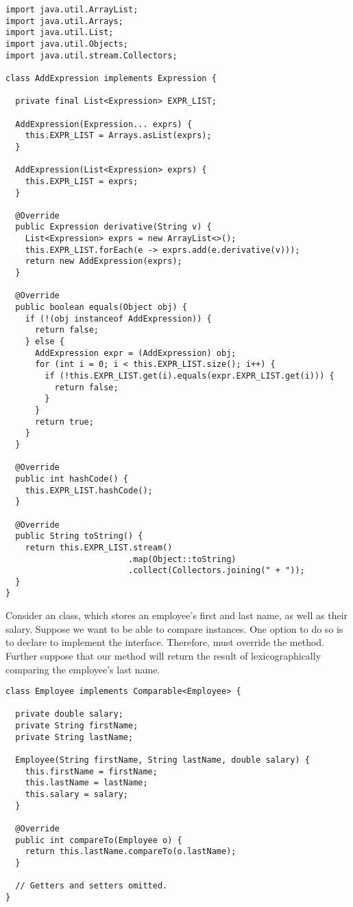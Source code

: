 \newpage %
\begin{lstlisting}[language=MyJava]
import java.util.ArrayList;
import java.util.Arrays;
import java.util.List;
import java.util.Objects;
import java.util.stream.Collectors;

class AddExpression implements Expression {

  private final List<Expression> EXPR_LIST;

  AddExpression(Expression... exprs) {
    this.EXPR_LIST = Arrays.asList(exprs);
  }

  AddExpression(List<Expression> exprs) { 
    this.EXPR_LIST = exprs; 
  }

  @Override
  public Expression derivative(String v) {
    List<Expression> exprs = new ArrayList<>();
    this.EXPR_LIST.forEach(e -> exprs.add(e.derivative(v)));
    return new AddExpression(exprs);
  }

  @Override
  public boolean equals(Object obj) {
    if (!(obj instanceof AddExpression)) { 
      return false; 
    } else { 
      AddExpression expr = (AddExpression) obj;
      for (int i = 0; i < this.EXPR_LIST.size(); i++) {
        if (!this.EXPR_LIST.get(i).equals(expr.EXPR_LIST.get(i))) { 
          return false; 
        }
      }
      return true;
    }
  }

  @Override
  public int hashCode() { 
    this.EXPR_LIST.hashCode(); 
  }

  @Override
  public String toString() { 
    return this.EXPR_LIST.stream()
                         .map(Object::toString)
                         .collect(Collectors.joining(" + "));
  }
}
\end{lstlisting}

\newpage %
Consider an  class, which stores an employee's first and last name, as well as their salary. 
Suppose we want to be able to compare  instances. 
One option to do so is to declare  to implement the  interface. 
Therefore,  must override the  method. 
Further suppose that our method will return the result of lexicographically comparing the employee's last name.

\begin{lstlisting}[language=MyJava]
class Employee implements Comparable<Employee> {

  private double salary;
  private String firstName;
  private String lastName;

  Employee(String firstName, String lastName, double salary) {
    this.firstName = firstName;
    this.lastName = lastName;
    this.salary = salary;
  }

  @Override
  public int compareTo(Employee o) {
    return this.lastName.compareTo(o.lastName);
  }

  // Getters and setters omitted.
}
\end{lstlisting}

